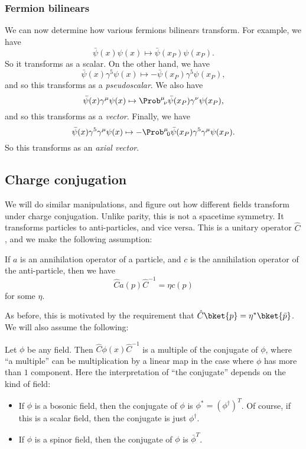 \documentclass[a4paper]{article}
\begin{document}
\subsubsection*{Fermion bilinears}
We can now determine how various fermions bilinears transform. For example, we have
\[
  \bar\psi(x) \psi(x) \mapsto \bar\psi(x_P) \psi(x_P).
\]
So it transforms as a scalar. On the other hand, we have
\[
  \bar\psi(x) \gamma^5 \psi(x) \mapsto - \bar{\psi}(x_P) \gamma^5 \psi(x_P),
\]
and so this transforms as a \emph{pseudoscalar}. We also have
\[
  \bar\psi(x) \gamma^\mu \psi(x) \mapsto \Prob^\mu\!_\nu \bar\psi(x_P) \gamma^\nu \psi(x_P),
\]
and so this transforms as a \emph{vector}. Finally, we have
\[
  \bar\psi(x) \gamma^5 \gamma^\mu \psi(x) \mapsto - \Prob^\mu\!_0 \bar\psi(x_P) \gamma^5 \gamma^\mu \psi(x_P).
\]
So this transforms as an \emph{axial vector}.
\subsection{Charge conjugation}
We will do similar manipulations, and figure out how different fields transform under charge conjugation. Unlike parity, this is not a spacetime symmetry. It transforms particles to anti-particles, and vice versa. This is a unitary operator $\hat{C}$, and we make the following assumption:

\begin{assumption}
  If $a$ is an annihilation operator of a particle, and $c$ is the annihilation operator of the anti-particle, then we have
  \[
    \hat{C} a(p)\hat{C}^{-1} = \eta c(p)
  \]
  for some $\eta$.
\end{assumption}

As before, this is motivated by the requirement that $\hat{C} \bket{p} = \eta^* \bket{\bar{p}}$. We will also assume the following:
\begin{assumption}
  Let $\phi$ be any field. Then $\hat{C} \phi(x) \hat{C}^{-1}$ is a multiple of the conjugate of $\phi$, where ``a multiple'' can be multiplication by a linear map in the case where $\phi$ has more than $1$ component. Here the interpretation of ``the conjugate'' depends on the kind of field:
  \begin{itemize}
    \item If $\phi$ is a bosonic field, then the conjugate of $\phi$ is $\phi^* = (\phi^\dagger)^T$. Of course, if this is a scalar field, then the conjugate is just $\phi^\dagger$.
    \item If $\phi$ is a spinor field, then the conjugate of $\phi$ is $\bar{\phi}^T$.
  \end{itemize}
\end{assumption}
\end{document}
